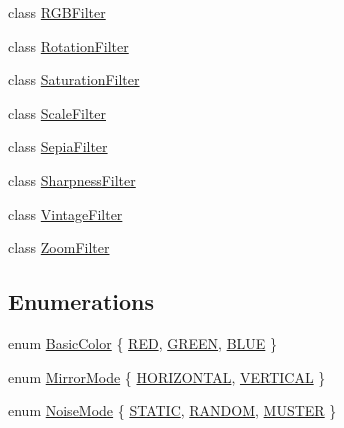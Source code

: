 \begin{DoxyCompactItemize}
\item 
class \hyperlink{classModel_1_1Filter_1_1RGBFilter}{R\+G\+B\+Filter}
\item 
class \hyperlink{classModel_1_1Filter_1_1RotationFilter}{Rotation\+Filter}
\item 
class \hyperlink{classModel_1_1Filter_1_1SaturationFilter}{Saturation\+Filter}
\item 
class \hyperlink{classModel_1_1Filter_1_1ScaleFilter}{Scale\+Filter}
\item 
class \hyperlink{classModel_1_1Filter_1_1SepiaFilter}{Sepia\+Filter}
\item 
class \hyperlink{classModel_1_1Filter_1_1SharpnessFilter}{Sharpness\+Filter}
\item 
class \hyperlink{classModel_1_1Filter_1_1VintageFilter}{Vintage\+Filter}
\item 
class \hyperlink{classModel_1_1Filter_1_1ZoomFilter}{Zoom\+Filter}
\end{DoxyCompactItemize}
\subsection*{Enumerations}
\begin{DoxyCompactItemize}
\item 
enum \hyperlink{namespaceModel_1_1Filter_a54742b2fc8f6a246926cbb87b7fae1a4}{Basic\+Color} \{ \hyperlink{namespaceModel_1_1Filter_a54742b2fc8f6a246926cbb87b7fae1a4af80f9a890089d211842d59625e561f88}{R\+E\+D}, 
\hyperlink{namespaceModel_1_1Filter_a54742b2fc8f6a246926cbb87b7fae1a4aa60bd322f93178d68184e30e162571ca}{G\+R\+E\+E\+N}, 
\hyperlink{namespaceModel_1_1Filter_a54742b2fc8f6a246926cbb87b7fae1a4a35d6719cb4d7577c031b3d79057a1b79}{B\+L\+U\+E}
 \}
\item 
enum \hyperlink{namespaceModel_1_1Filter_a8a20195c97d8c704572b5922370c2fbc}{Mirror\+Mode} \{ \hyperlink{namespaceModel_1_1Filter_a8a20195c97d8c704572b5922370c2fbca4dd51ad73508d6fc83a502966779e48e}{H\+O\+R\+I\+Z\+O\+N\+T\+A\+L}, 
\hyperlink{namespaceModel_1_1Filter_a8a20195c97d8c704572b5922370c2fbca1a88641fcd39f2ed3e58a18526e97138}{V\+E\+R\+T\+I\+C\+A\+L}
 \}
\item 
enum \hyperlink{namespaceModel_1_1Filter_a0466e3095e9c21e5864d8964e9d7df59}{Noise\+Mode} \{ \hyperlink{namespaceModel_1_1Filter_a0466e3095e9c21e5864d8964e9d7df59ae55a36a850c67d46b3b3325de7fce0b8}{S\+T\+A\+T\+I\+C}, 
\hyperlink{namespaceModel_1_1Filter_a0466e3095e9c21e5864d8964e9d7df59aa2b65445a3a16f164c5e811064d75726}{R\+A\+N\+D\+O\+M}, 
\hyperlink{namespaceModel_1_1Filter_a0466e3095e9c21e5864d8964e9d7df59abdc738e06735e7d289096acf524331c0}{M\+U\+S\+T\+E\+R}
 \}
\end{DoxyCompactItemize}


